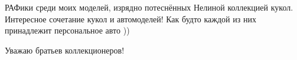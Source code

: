  
 
 
 
 

РАФики среди моих моделей, изрядно потеснённых Нелиной коллекцией кукол.
Интересное сочетание кукол и автомоделей! Как будто каждой из них принадлежит персональное авто ))

Уважаю братьев коллекционеров!

